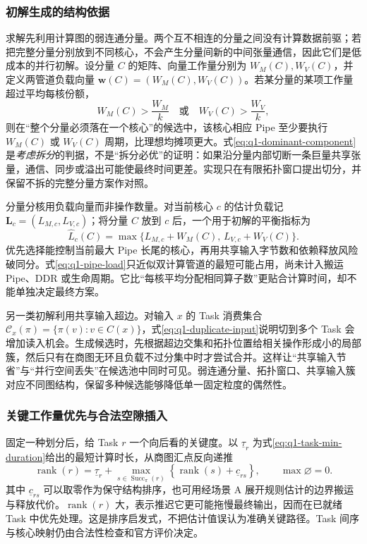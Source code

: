 \subsubsection{初解生成的结构依据}
求解先利用计算图的弱连通分量。两个互不相连的分量之间没有计算数据前驱；若把完整分量分别放到不同核心，不会产生分量间新的中间张量通信，因此它们是低成本的并行初解。设分量 $C$ 的矩阵、向量工作量分别为 $W_M(C),W_V(C)$，并定义两管道负载向量 $\mathbf w(C)=(W_M(C),W_V(C))$。若某分量的某项工作量超过平均每核份额，
\begin{equation}\label{eq:q1-dominant-component}
W_M(C)>\frac{W_M}{k}
\quad\text{或}\quad
W_V(C)>\frac{W_V}{k},
\end{equation}
则在“整个分量必须落在一个核心”的候选中，该核心相应 Pipe 至少要执行 $W_M(C)$ 或 $W_V(C)$ 周期，比理想均摊项更大。式\eqref{eq:q1-dominant-component}是\emph{考虑拆分}的判据，不是“拆分必优”的证明：如果沿分量内部切断一条巨量共享张量，通信、同步或溢出可能使最终时间更差。实现只在有限拓扑窗口提出切分，并保留不拆的完整分量方案作对照。

分量分核用负载向量而非操作数量。对当前核心 $c$ 的估计负载记 $\mathbf L_c=(L_{M,c},L_{V,c})$；将分量 $C$ 放到 $c$ 后，一个用于初解的平衡指标为
\begin{equation}\label{eq:q1-pipe-load}
\widehat L_c(C)=
\max\{L_{M,c}+W_M(C),\,L_{V,c}+W_V(C)\}.
\end{equation}
优先选择能控制当前最大 Pipe 长尾的核心，再用共享输入字节数和依赖释放风险破同分。式\eqref{eq:q1-pipe-load}只近似双计算管道的最短可能占用，尚未计入搬运 Pipe、DDR 或生命周期。它比“每核平均分配相同算子数”更贴合计算时间，却不能单独决定最终方案。

另一类初解利用共享输入超边。对输入 $x$ 的 Task 消费集合 $\mathcal C_x(\pi)=\{\pi(v):v\in C(x)\}$，式\eqref{eq:q1-duplicate-input}说明切到多个 Task 会增加读入机会。生成候选时，先根据超边交集和拓扑位置给相关操作形成小的局部簇，然后只有在商图无环且负载不过分集中时才尝试合并。这样让“共享输入节省”与“并行空间丢失”在候选池中同时可见。弱连通分量、拓扑窗口、共享输入簇对应不同图结构，保留多种候选能够降低单一固定粒度的偶然性。

\subsubsection{关键工作量优先与合法空隙插入}
固定一种划分后，给 Task $r$ 一个向后看的关键度。以 $\underline\tau_r$ 为式\eqref{eq:q1-task-min-duration}给出的最短计算时长，从商图汇点反向递推
\begin{equation}\label{eq:q1-upward-rank}
\operatorname{rank}(r)=\underline\tau_r+
\max_{s\in\operatorname{Succ}_{\pi}(r)}
\left\{\operatorname{rank}(s)+\underline c_{rs}\right\},
\qquad \max\varnothing=0.
\end{equation}
其中 $\underline c_{rs}$ 可以取零作为保守结构排序，也可用经场景 A 展开规则估计的边界搬运与释放代价。$\operatorname{rank}(r)$ 大，表示推迟它更可能拖慢最终输出，因而在已就绪 Task 中优先处理。这是排序启发式，不把估计值误认为准确关键路径。Task 间序与核心映射仍由合法性检查和官方评价决定。

